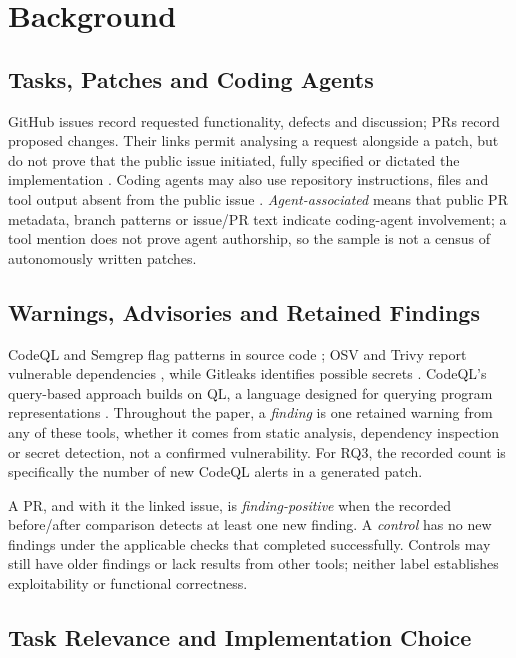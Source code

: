\documentclass[acmsmall,screen,nonacm,review]{acmart}
\begin{document}
\section{Background}\label{sec:background}

\subsection{Tasks, Patches and Coding Agents}

GitHub issues record requested functionality, defects and discussion; PRs record proposed changes. Their links permit analysing a request alongside a patch, but do not prove that the public issue initiated, fully specified or dictated the implementation \cite{b5}. Coding agents may also use repository instructions, files and tool output absent from the public issue \cite{b20,b22}. \emph{Agent-associated} means that public PR metadata, branch patterns or issue/PR text indicate coding-agent involvement; a tool mention does not prove agent authorship, so the sample is not a census of autonomously written patches.

\subsection{Warnings, Advisories and Retained Findings}

CodeQL and Semgrep flag patterns in source code \cite{b44,b52}; OSV and Trivy report vulnerable dependencies \cite{b51,b50}, while Gitleaks identifies possible secrets \cite{b53}. CodeQL's query-based approach builds on QL, a language designed for querying program representations \cite{b44}. Throughout the paper, a \emph{finding} is one retained warning from any of these tools, whether it comes from static analysis, dependency inspection or secret detection, not a confirmed vulnerability. For RQ3, the recorded count is specifically the number of new CodeQL alerts in a generated patch.

A PR, and with it the linked issue, is \emph{finding-positive} when the recorded before/after comparison detects at least one new finding. A \emph{control} has no new findings under the applicable checks that completed successfully. Controls may still have older findings or lack results from other tools; neither label establishes exploitability or functional correctness.

\subsection{Task Relevance and Implementation Choice}
\end{document}
